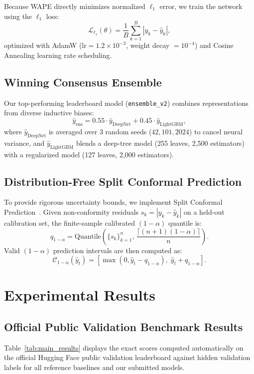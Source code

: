\documentclass[11pt,a4paper]{article}
\begin{document}
Because WAPE directly minimizes normalized $\ell_1$ error, we train the network using the $\ell_1$ loss:
\begin{equation}
    \mathcal{L}_{\ell_1}(\theta) = \frac{1}{B} \sum_{k=1}^B |y_k - \hat{y}_k|,
\end{equation}
optimized with AdamW ($\text{lr} = 1.2 \times 10^{-3}$, weight decay $= 10^{-4}$) and Cosine Annealing learning rate scheduling.

\subsection{Winning Consensus Ensemble}
Our top-performing leaderboard model (\texttt{ensemble\_v2}) combines representations from diverse inductive biases:
\begin{equation}
    \hat{y}_{\text{ens}} = 0.55 \cdot \hat{y}_{\text{DeepNet}} + 0.45 \cdot \hat{y}_{\text{LightGBM}},
\end{equation}
where $\hat{y}_{\text{DeepNet}}$ is averaged over 3 random seeds ($42, 101, 2024$) to cancel neural variance, and $\hat{y}_{\text{LightGBM}}$ blends a deep-tree model (255 leaves, 2,500 estimators) with a regularized model (127 leaves, 2,000 estimators).

\subsection{Distribution-Free Split Conformal Prediction}
To provide rigorous uncertainty bounds, we implement Split Conformal Prediction~\cite{angelopoulos2021conformal}. Given non-conformity residuals $s_k = |y_k - \hat{y}_k|$ on a held-out calibration set, the finite-sample calibrated $(1-\alpha)$ quantile is:
\begin{equation}
    q_{1-\alpha} = \text{Quantile}\left(\{s_k\}_{k=1}^n, \, \frac{\lceil (n+1)(1-\alpha) \rceil}{n}\right).
\end{equation}
Valid $(1-\alpha)$ prediction intervals are then computed as:
\begin{equation}
    \mathcal{C}_{1-\alpha}(\hat{y}_t) = \left[ \max(0, \hat{y}_t - q_{1-\alpha}), \; \hat{y}_t + q_{1-\alpha} \right].
\end{equation}

\section{Experimental Results}

\subsection{Official Public Validation Benchmark Results}
Table~\ref{tab:main_results} displays the exact scores computed automatically on the official Hugging Face public validation leaderboard against hidden validation labels for all reference baselines and our submitted models.
\end{document}
